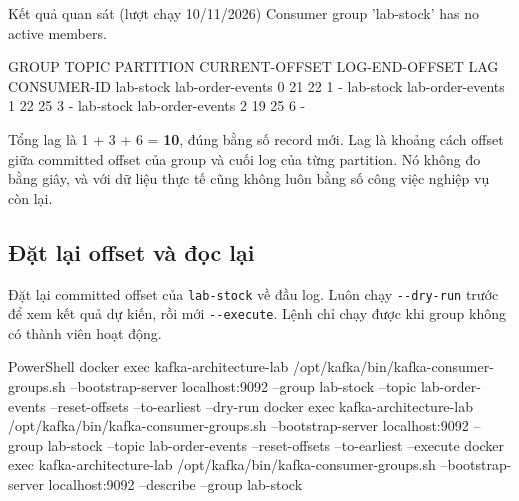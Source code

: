 
\begin{aivnCodeOutput}{Kết quả quan sát (lượt chạy 10/11/2026)}
Consumer group 'lab-stock' has no active members.

GROUP      TOPIC             PARTITION  CURRENT-OFFSET  LOG-END-OFFSET  LAG  CONSUMER-ID
lab-stock  lab-order-events  0          21              22              1    -
lab-stock  lab-order-events  1          22              25              3    -
lab-stock  lab-order-events  2          19              25              6    -
\end{aivnCodeOutput}

Tổng lag là 1 + 3 + 6 = \textbf{10}, đúng bằng số record mới. Lag là khoảng cách offset giữa committed offset của group và cuối log của từng partition. Nó không đo bằng giây, và với dữ liệu thực tế cũng không luôn bằng số công việc nghiệp vụ còn lại.


\subsection{Đặt lại offset và đọc lại}

Đặt lại committed offset của \texttt{lab-\allowbreak{}stock} về đầu log. Luôn chạy \texttt{-\allowbreak{}-\allowbreak{}dry-\allowbreak{}run} trước để xem kết quả dự kiến, rồi mới \texttt{-\allowbreak{}-\allowbreak{}execute}. Lệnh chỉ chạy được khi group không có thành viên hoạt động.


\begin{aivncodebox}[language={}]{PowerShell}
docker exec kafka-architecture-lab /opt/kafka/bin/kafka-consumer-groups.sh --bootstrap-server localhost:9092 --group lab-stock --topic lab-order-events --reset-offsets --to-earliest --dry-run
docker exec kafka-architecture-lab /opt/kafka/bin/kafka-consumer-groups.sh --bootstrap-server localhost:9092 --group lab-stock --topic lab-order-events --reset-offsets --to-earliest --execute
docker exec kafka-architecture-lab /opt/kafka/bin/kafka-consumer-groups.sh --bootstrap-server localhost:9092 --describe --group lab-stock
\end{aivncodebox}

